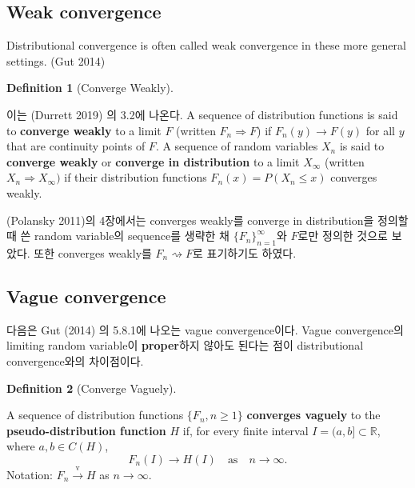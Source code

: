\documentclass[
  letterpaper,
  DIV=11,
  numbers=noendperiod]{scrreprt}
\theoremstyle{plain}
\theoremstyle{definition}
\theoremstyle{definition}
\newtheorem{definition}{Definition}[chapter]
\theoremstyle{plain}
\theoremstyle{plain}
\theoremstyle{remark}
\begin{document}
\subsection{Weak convergence}\label{weak-convergence}

Distributional convergence is often called weak convergence in these
more general settings. (Gut 2014)

\begin{definition}[Converge
Weakly]\protect\hypertarget{def-wconv}{}\label{def-wconv}

이는 (Durrett 2019) 의 3.2에 나온다. A sequence of distribution
functions is said to \textbf{converge weakly} to a limit \(F\) (written
\(F_n \Rightarrow F\)) if \(F_n(y) \rightarrow F(y)\) for all \(y\) that
are continuity points of \(F\). A sequence of random variables \(X_n\)
is said to \textbf{converge weakly} or \textbf{converge in distribution}
to a limit \(X_{\infty}\) (written \(X_n \Rightarrow X_{\infty})\) if
their distribution functions \(F_n (x) = P(X_n \leq x)\) converges
weakly.

\end{definition}

(Polansky 2011)의 4장에서는 converges weakly를 converge in
distribution을 정의할 때 쓴 random variable의 sequence를 생략한 채
\(\{F_n\}_{n=1}^{\infty}\)와 \(F\)로만 정의한 것으로 보았다. 또한
converges weakly를 \(F_n \rightsquigarrow F\)로 표기하기도 하였다.

\subsection{Vague convergence}\label{vague-convergence}

다음은 Gut (2014) 의 5.8.1에 나오는 vague convergence이다. Vague
convergence의 limiting random variable이 \textbf{proper}하지 않아도
된다는 점이 distributional convergence와의 차이점이다.

\begin{definition}[Converge
Vaguely]\protect\hypertarget{def-vconv}{}\label{def-vconv}

A sequence of distribution functions \(\{F_n, n\geq 1\}\)
\textbf{converges vaguely} to the \textbf{pseudo-distribution function}
\(H\) if, for every finite interval \(I=(a,b] \subset \mathbb{R}\),
where \(a,b\in C(H)\), \[
F_n(I) \rightarrow H(I) \quad{} \text{as} \quad{} n \rightarrow \infty.
\] Notation: \(F_n \stackrel{\text{v}}{\rightarrow}H\) as
\(n\rightarrow \infty\).

\end{definition}
\end{document}
